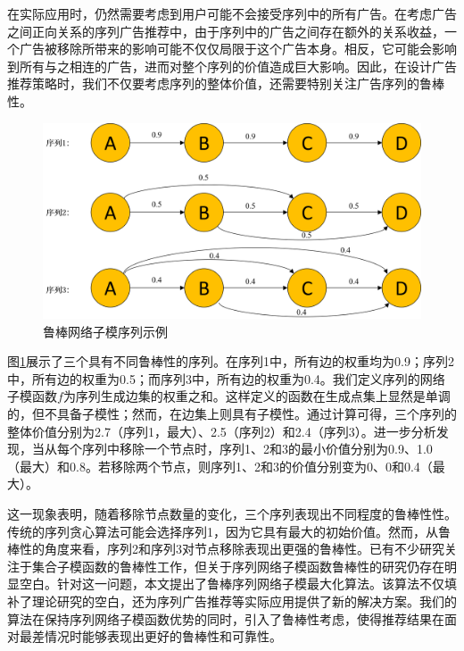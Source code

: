 在实际应用时，仍然需要考虑到用户可能不会接受序列中的所有广告。在考虑广告之间正向关系的序列广告推荐中，由于序列中的广告之间存在额外的关系收益，一个广告被移除所带来的影响可能不仅仅局限于这个广告本身。相反，它可能会影响到所有与之相连的广告，进而对整个序列的价值造成巨大影响。因此，在设计广告推荐策略时，我们不仅要考虑序列的整体价值，还需要特别关注广告序列的鲁棒性。

\begin{figure}[th]
    \centering
    \includegraphics[width=.89\linewidth]{figure/rosenets/sample1}
    \caption{鲁棒网络子模序列示例}
    \label{fig:robust_sample}
\end{figure}

图\ref{fig:robust_sample}展示了三个具有不同鲁棒性的序列。在序列1中，所有边的权重均为0.9；序列2中，所有边的权重为0.5；而序列3中，所有边的权重为0.4。我们定义序列的网络子模函数$f$为序列生成边集的权重之和。这样定义的函数在生成点集上显然是单调的，但不具备子模性；然而，在边集上则具有子模性。通过计算可得，三个序列的整体价值分别为2.7（序列1，最大）、2.5（序列2）和2.4（序列3）。进一步分析发现，当从每个序列中移除一个节点时，序列1、2和3的最小价值分别为0.9、1.0（最大）和0.8。若移除两个节点，则序列1、2和3的价值分别变为0、0和0.4（最大）。

这一现象表明，随着移除节点数量的变化，三个序列表现出不同程度的鲁棒性性。传统的序列贪心算法\cite{tschiatschek2017selecting,mitrovic2018submodularity}可能会选择序列1，因为它具有最大的初始价值。然而，从鲁棒性的角度来看，序列2和序列3对节点移除表现出更强的鲁棒性。已有不少研究关注于集合子模函数的鲁棒性工作\cite{orlin2018robust,bogunovic2017robust,mitrovic2017streaming,tzoumas2017resilient}，但关于序列网络子模函数鲁棒性的研究仍存在明显空白。针对这一问题，本文提出了鲁棒序列网络子模最大化算法。该算法不仅填补了理论研究的空白，还为序列广告推荐等实际应用提供了新的解决方案。我们的算法在保持序列网络子模函数优势的同时，引入了鲁棒性考虑，使得推荐结果在面对最差情况时能够表现出更好的鲁棒性和可靠性。

